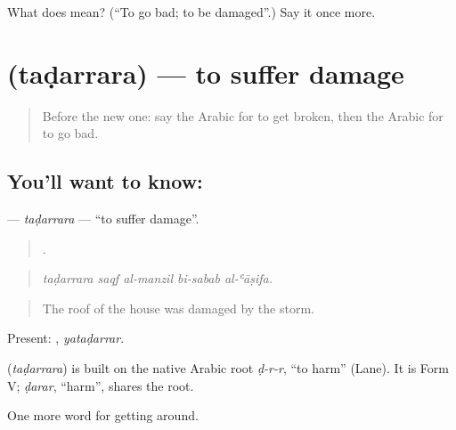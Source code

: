 \begin{tcolorbox}[breakable,colback=teal!4,colframe=teal!35!black,title={Before you move on}]
What does  mean? (\textquotedblleft{}To go bad; to be damaged\textquotedblright{}.) Say it once more.
\end{tcolorbox}
\section[\texorpdfstring{\ar{تضرر} (taḍarrara)}{تضرر (taḍarrara)}]{ (taḍarrara) — to suffer damage}

\label{lesson:AR-C460-tadarrara}



\begin{quote}
Before the new one: say the Arabic for to get broken, then the Arabic for to go bad.
\end{quote}

\subsection*{You'll want to know: }
\textbf{} — \emph{taḍarrara} — \textquotedblleft{}to suffer damage\textquotedblright{}.

\begin{quote}
    .
\end{quote}

\begin{quote}
\emph{taḍarrara saqf al-manzil bi-sabab al-ʿāṣifa.}
\end{quote}

\begin{quote}
The roof of the house was damaged by the storm.
\end{quote}

Present: , \emph{yataḍarrar}.

\begin{cousinweb}
\textbf{} (\emph{taḍarrara}) is built on the native Arabic root \emph{ḍ-r-r}, \textquotedblleft{}to harm\textquotedblright{} (Lane). It is Form V; \emph{ḍarar}, \textquotedblleft{}harm\textquotedblright{}, shares the root.
\end{cousinweb}

\begin{grammarlens}[title={What you've built}]
One more word for getting around.
\end{grammarlens}


